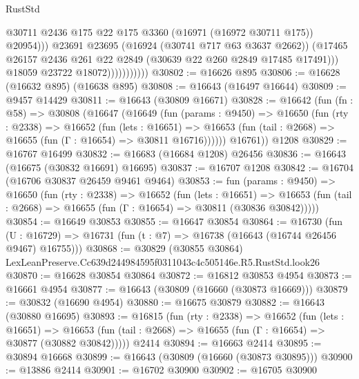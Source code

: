 \begin{lexlean}{RustStd}
\begin{coremodule}
                                  @30711
                                  @2436
                                  @175
                                  @22
                                  @175
                                  @3360
                                  (@16971 (@16972 @30711 @175))
                                  @20954)))
                            @23691
                            @23695
                            (@16924 (@30741 @717 @63 @3637 @2662))
                            (@17465
                              @26157
                              @2436
                              @261
                              @22
                              @2849
                              (@30639 @22 @260 @2849 @17485 @17491)))
                          @18059
                          @23722
                          @18072)))))))))))
@30802 := @16626 @895
@30806 := @16628 (@16632 @895) (@16638 @895)
@30808 := @16643 (@16497 @16644)
@30809 := @9457 @14429
@30811 := @16643 (@30809 @16671)
@30828 := @16642
    (fun (fn : @58) =>
    @30808
      (@16647
        (@16649
          (fun (params : @9450) =>
          @16650
            (fun (rty : @2338) =>
            @16652
              (fun (lets : @16651) =>
              @16653 (fun (tail : @2668) => @16655 (fun (Γ : @16654) => @30811 @16716))))))
        @16761))
    @1208
@30829 := @16767 @16499
@30832 := @16683 (@16684 @1208) @26456
@30836 := @16643 (@16675 (@30832 @16691) @16695)
@30837 := @16707 @1208
@30842 := @16704 (@16706 @30837 @26459 @9461 @9464)
@30853 := fun (params : @9450) =>
  @16650
    (fun (rty : @2338) =>
    @16652
      (fun (lets : @16651) =>
      @16653 (fun (tail : @2668) => @16655 (fun (Γ : @16654) => @30811 (@30836 @30842)))))
@30854 := @16649 @30853
@30855 := @16647 @30854
@30864 := @16730
    (fun (U : @16729) => @16731 (fun (t : @7) => @16738 (@16643 (@16744 @26456 @9467) @16755)))
@30868 := @30829 (@30855 @30864) LexLeanPreserve.Cc639d244984595f0311043c4c505146e.R5.RustStd.look26
@30870 := @16628 @30854 @30864
@30872 := @16812 @30853 @4954
@30873 := @16661 @4954
@30877 := @16643 (@30809 (@16660 (@30873 @16669)))
@30879 := @30832 (@16690 @4954)
@30880 := @16675 @30879
@30882 := @16643 (@30880 @16695)
@30893 := @16815
    (fun (rty : @2338) =>
    @16652
      (fun (lets : @16651) =>
      @16653 (fun (tail : @2668) => @16655 (fun (Γ : @16654) => @30877 (@30882 @30842)))))
    @2414
@30894 := @16663 @2414
@30895 := @30894 @16668
@30899 := @16643 (@30809 (@16660 (@30873 @30895)))
@30900 := @13886 @2414
@30901 := @16702 @30900
@30902 := @16705 @30900

\end{coremodule}
\end{lexlean}

